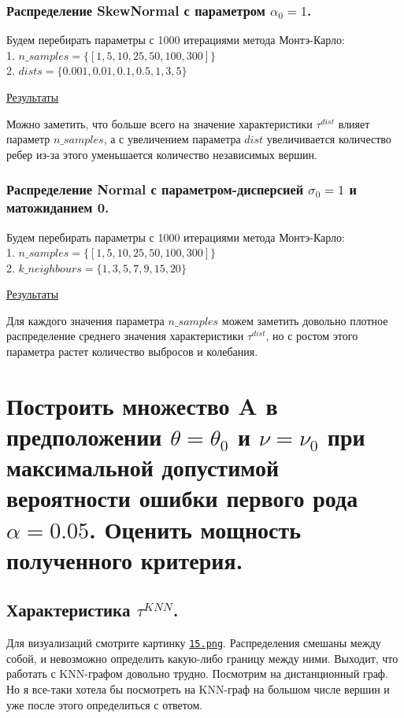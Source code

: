 \documentclass{report}
\begin{document}
\subsection{Распределение SkewNormal с параметром $\alpha_0=1$.}
Будем перебирать параметры с 1000 итерациями метода Монтэ-Карло:\\
1. $n\_samples = \{[1, 5, 10, 25, 50, 100, 300]\}$\\
2. $dists = \{0.001, 0.01, 0.1, 0.5, 1, 3, 5\}$

\href{https://github.com/misshimichka/dm-random-graphs/blob/dmitrii/report/report/fix_alpha_skewnorm_mis_dist.png}{Результаты}

Можно заметить, что больше всего на значение характеристики $\tau^{dist}$ влияет параметр $n\_samples$, а с увеличением параметра $dist$ увеличивается количество ребер из-за этого уменьшается количество независимых вершин. 

\subsection{Распределение Normal с параметром-дисперсией $\sigma_0=1$ и матожиданием 0.}
Будем перебирать параметры с 1000 итерациями метода Монтэ-Карло:\\
1. $n\_samples = \{[1, 5, 10, 25, 50, 100, 300]\}$\\
2. $k\_neighbours = \{1, 3, 5, 7, 9, 15, 20\}$

\href{https://github.com/misshimichka/dm-random-graphs/blob/dmitrii/report/report/fix_sigma_norm_mis_dist.png}{Результаты}

Для каждого значения параметра $n\_samples$ можем заметить довольно плотное распределение среднего значения характеристики $\tau^{dist}$, но с ростом этого параметра растет количество выбросов и колебания.

\chapter{Построить множество A в предположении $\theta = \theta_0$ и $\nu = \nu_0$ при максимальной допустимой вероятности ошибки первого рода $\alpha = 0.05$. Оценить мощность полученного критерия.}
\section{Характеристика $\tau^{KNN}$.}
Для визуализаций смотрите картинку \texttt{\href{https://github.com/misshimichka/dm-random-graphs/blob/report/report/15.png}{15.png}}.
\newline
\newline
Распределения смешаны между собой, и невозможно определить какую-либо границу между ними. Выходит, что работать с KNN-графом довольно трудно. Посмотрим на дистанционный граф. 
\newline
\newline
Но я все-таки хотела бы посмотреть на KNN-граф на большом числе вершин и уже после этого определиться с ответом.
\end{document}
